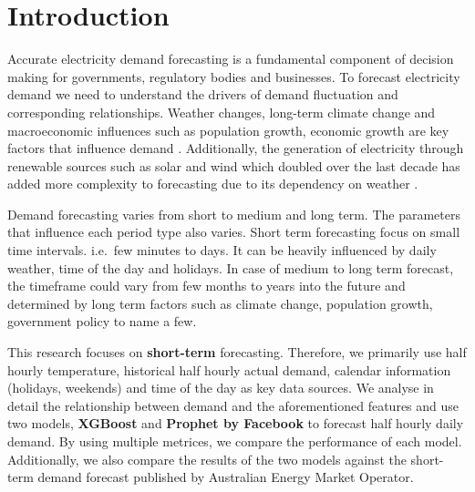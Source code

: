 \documentclass[mstat,12pt]{unswthesis}
\begin{document}


\afterpreface





%
%






\chapter{Introduction}\label{introduction}

Accurate electricity demand forecasting is a fundamental component of
decision making for governments, regulatory bodies and businesses. To
forecast electricity demand we need to understand the drivers of demand
fluctuation and corresponding relationships. Weather changes, long-term
climate change and macroeconomic influences such as population growth,
economic growth are key factors that influence demand \cite{a2024_nem}.
Additionally, the generation of electricity through renewable sources
such as solar and wind which doubled over the last decade has added more
complexity to forecasting due to its dependency on weather
\cite{energygovau_2024_renewables}.

Demand forecasting varies from short to medium and long term. The
parameters that influence each period type also varies. Short term
forecasting focus on small time intervals. i.e.~few minutes to days. It
can be heavily influenced by daily weather, time of the day and
holidays. In case of medium to long term forecast, the timeframe could
vary from few months to years into the future and determined by long
term factors such as climate change, population growth, government
policy to name a few.

This research focuses on \textbf{short-term} forecasting. Therefore, we
primarily use half hourly temperature, historical half hourly actual
demand, calendar information (holidays, weekends) and time of the day as
key data sources. We analyse in detail the relationship between demand
and the aforementioned features and use two models, \textbf{XGBoost} and
\textbf{Prophet by Facebook} to forecast half hourly daily demand. By
using multiple metrices, we compare the performance of each model.
Additionally, we also compare the results of the two models against the
short-term demand forecast published by Australian Energy Market
Operator.
\end{document}

